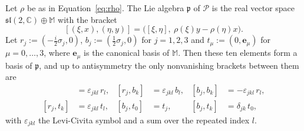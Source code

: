 \begin{proposition}\label{prop:poincare-algebra}
	Let $\rho$ be as in Equation~\eqref{eq:rho}. The Lie algebra $\mathfrak{p}$ of $\mathcal{P}$ is the real vector space $\mathfrak{sl}(2,\mathbb{C})\oplus\mathbb{M}$ with the bracket
	\begin{equation}\label{eq:poincare-bracket}
		[(\xi,x),(\eta,y)]=\big([\xi,\eta],\ \rho(\xi)y-\rho(\eta)x\big).
	\end{equation}
	Let $r_j:=(-\tfrac i2\sigma_j,0)$, $b_j:=(\tfrac12\sigma_j,0)$ for $j=1,2,3$ and $t_\mu:=(0,\mathbf{e}_\mu)$ for $\mu=0,\dots,3$, where $\mathbf{e}_\mu$ is the canonical basis of $\mathbb{M}$. Then these ten elements form a basis of $\mathfrak{p}$, and up to antisymmetry the only nonvanishing brackets between them are
	\begin{align}
		[r_j,r_k]&=\varepsilon_{jkl}\,r_l, & [r_j,b_k]&=\varepsilon_{jkl}\,b_l, & [b_j,b_k]&=-\varepsilon_{jkl}\,r_l,\label{eq:lorentz-algebra}\\
		[r_j,t_k]&=\varepsilon_{jkl}\,t_l, & [b_j,t_0]&=t_j, & [b_j,t_k]&=\delta_{jk}\,t_0,\label{eq:translation-action}
	\end{align}
	with $\varepsilon_{jkl}$ the Levi-Civita symbol and a sum over the repeated index $l$.
\end{proposition}


